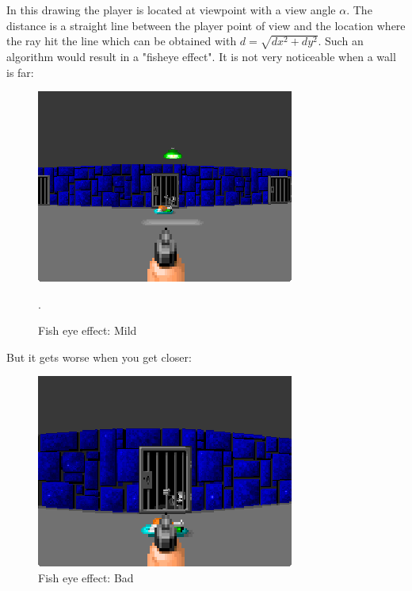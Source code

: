 In this drawing the player is located at viewpoint with a view angle \begin{math}\alpha\end{math}. The distance  is a straight line between the player point of view and the location where the ray hit the line which can be obtained with $d = \sqrt{dx^2 + dy^2}$. Such an algorithm would result in a "fisheye effect". It is not very noticeable when a wall is far:

\begin{figure}[H]
\centering
 \includegraphics[width=\textwidth]{imgs/fish_eye/bad_mild.png}
 \caption{Fish eye effect: Mild}. \label{fig:mips}
 \end{figure}

But it gets worse when you get closer:
\begin{figure}[H]
\centering
 \includegraphics[width=\textwidth]{imgs/fish_eye/bad_ok.png}
 \caption{Fish eye effect: Bad} \label{fig:mips}
 \end{figure}

